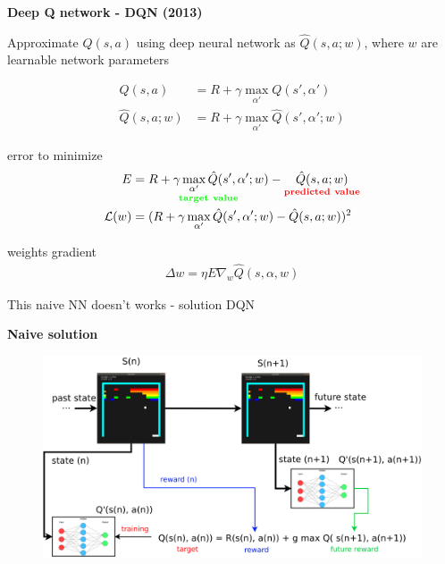 \documentclass[xcolor=dvipsnames]{beamer}
\begin{document}
\begin{frame}{\bf Deep Q network - DQN (2013)}

Approximate $Q(s, a)$ using deep neural network as $\hat{Q}(s, a; w)$, where $w$ are learnable network parameters

\begin{align*}
  Q(s, a) &= R + \gamma \max \limits_{\alpha'} Q(s', \alpha') \\
  \hat{Q}(s, a; w) &= R + \gamma \max \limits_{\alpha'} \hat{Q}(s', \alpha'; w)
\end{align*}

error to minimize
\begin{align*}
  E &= \underset{\bf \color{green} target\ value}{R + \gamma \max \limits_{\alpha'} \hat{Q}(s', \alpha'; w)} - \underset{\bf \color{red} predicted\ value}{\hat{Q}(s, a; w) } \\
  \mathcal{L}(w) &= (R + \gamma \max \limits_{\alpha'} \hat{Q}(s', \alpha'; w) - \hat{Q}(s, a; w))^2
\end{align*}

weights gradient
\begin{align*}
  \Delta w = \eta E \nabla _w \hat{Q}(s, \alpha, w)
\end{align*}

This naive NN doesn't works - solution DQN

\end{frame}


\begin{frame}{\bf Naive solution}

\begin{figure}
  \includegraphics[scale=0.25]{./diagrams/dqn_naive.png}
\end{figure}

\end{frame}
\end{document}
